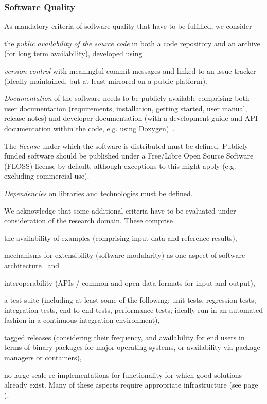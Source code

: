 \documentclass[a4paper,num-refs,numbers,sort&compress]{de-rse}
\begin{document}
\subsubsection{Software Quality}
As mandatory criteria of software quality that have to be fulfilled, we consider 
\begin{inlinelist}[resume]
    \item the \textit{public availability of the source code} in both a code repository and an archive (for long term availability), developed using
    \item \textit{version control} with meaningful commit messages and linked to an issue tracker (ideally maintained, but at least mirrored on a public platform). 
    \item \textit{Documentation} of the software needs to be publicly available comprising both user documentation (requirements, installation, getting started, user manual, release notes) and developer documentation (with a development guide and API documentation within the code, e.g. using Doxygen)~\cite{Lee2018}.
    \item The \textit{license} under which the software is distributed must be defined. Publicly funded software
should be published under a Free/Libre Open Source Software (FLOSS) license
by default, although exceptions to this might apply (e.g. excluding commercial use).
\item \textit{Dependencies} on libraries and technologies must be defined.
\end{inlinelist}

We acknowledge that some additional criteria have to be evaluated under consideration of the research domain. These comprise 
\begin{inlinelist}[resume]
    \item the availability of examples (comprising input data and reference results), 
    \item mechanisms for extensibility (software modularity) as one aspect of software architecture~\cite{Venters2018} and 
    \item interoperability (APIs / common and open data formats for input and output), 
    \item a test suite (including at least some of the following: unit tests, regression tests, integration tests, end-to-end tests, performance tests; ideally run in an automated fashion in a continuous integration environment),
    \item tagged releases (considering their frequency, and availability for end users in terms of binary packages for major operating systems, or availability via package managers or containers),
    \item no large-scale re-implementations for functionality for which good solutions already exist. Many of these aspects require appropriate infrastructure (see page \pageref{sec:infrastructure}).
\end{inlinelist}
\end{document}

